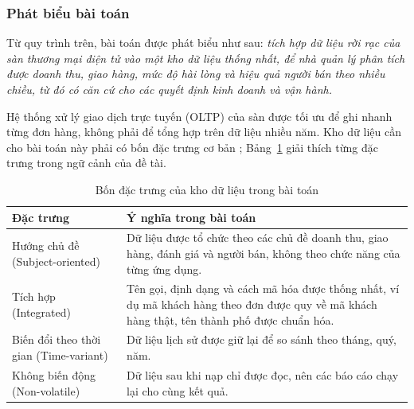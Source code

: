 

\subsubsection{Phát biểu bài toán}

Từ quy trình trên, bài toán được phát biểu như sau: \textit{tích hợp dữ liệu rời rạc của sàn thương mại điện tử vào một kho dữ liệu thống nhất, để nhà quản lý phân tích được doanh thu, giao hàng, mức độ hài lòng và hiệu quả người bán theo nhiều chiều, từ đó có căn cứ cho các quyết định kinh doanh và vận hành.}

Hệ thống xử lý giao dịch trực tuyến (OLTP) của sàn được tối ưu để ghi nhanh từng đơn hàng, không phải để tổng hợp trên dữ liệu nhiều năm. Kho dữ liệu cần cho bài toán này phải có bốn đặc trưng cơ bản \cite{inmon}; Bảng~\ref{tab:dactrung} giải thích từng đặc trưng trong ngữ cảnh của đề tài.

\begin{table}[H]
\centering
\small{}
\caption{Bốn đặc trưng của kho dữ liệu trong bài toán}
\label{tab:dactrung}
\begin{tabularx}{\linewidth}{|p{3.6cm}|X|}
\hline
\textbf{Đặc trưng} & \textbf{Ý nghĩa trong bài toán}\\ \hline
Hướng chủ đề (Subject-oriented) & Dữ liệu được tổ chức theo các chủ đề doanh thu, giao hàng, đánh giá và người bán, không theo chức năng của từng ứng dụng.\\ \hline
Tích hợp (Integrated) & Tên gọi, định dạng và cách mã hóa được thống nhất, ví dụ mã khách hàng theo đơn được quy về mã khách hàng thật, tên thành phố được chuẩn hóa.\\ \hline
Biến đổi theo thời gian (Time-variant) & Dữ liệu lịch sử được giữ lại để so sánh theo tháng, quý, năm.\\ \hline
Không biến động (Non-volatile) & Dữ liệu sau khi nạp chỉ được đọc, nên các báo cáo chạy lại cho cùng kết quả.\\ \hline
\end{tabularx}
\end{table}



